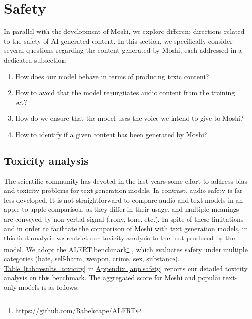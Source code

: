 \section{Safety}
\label{sec:safety}

In parallel with the development of Moshi, we explore different directions related to the safety of AI generated content. In this section, we specifically consider several questions regarding the content generated by Moshi, each addressed in a dedicated subsection: 
\begin{enumerate}
\item How does our model behave in terms of producing toxic content? 
\item How to avoid that the model regurgitates audio content from the training set? 
\item How do we ensure that the model uses the voice we intend to give to Moshi? 
\item How to identify if a given content has been generated by Moshi? 
\end{enumerate}



\subsection{Toxicity analysis}

The scientific community has devoted in the last years some effort to address bias and toxicity problems for text generation models. In contrast, audio safety is far less developed. It is not straightforward to compare audio and text models in an apple-to-apple comparison, as they differ in their usage, and multiple meanings are conveyed by non-verbal signal (irony, tone, etc.). In spite of these limitations and in order to facilitate the comparison of Moshi with text generation models, in this first analysis we restrict our toxicity analysis to the text produced by the model. We adopt the ALERT benchmark\footnote{\url{https://github.com/Babelscape/ALERT}} \citep{tedeschi2024alert}, which evaluates safety under multiple categories (hate, self-harm, weapon, crime, sex, substance). 
\hyperref[tab:results_toxicity]{Table~\ref{tab:results_toxicity}} in \hyperref[app:safety]{Appendix~\ref{app:safety}} reports our detailed toxicity analysis on this benchmark. The aggregated score for Moshi and popular text-only models is as follows: 
\medskip


\noindent
{}
\medskip

